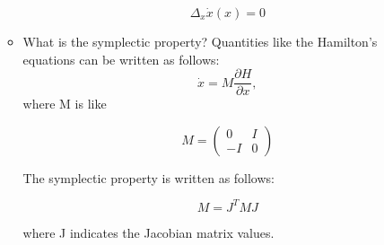 \begin{enumerate}
\begin{itemize}
        $$
        \Delta_x \dot{x}(x) = 0
        $$

        \item What is the symplectic property? Quantities like the Hamilton's equations can be written as follows:
        $$
        \dot{x} = M \frac{\partial H}{\partial x},
        $$
        where M is like 

        $$
        M = \begin{pmatrix} 0 & I\\ -I & 0\end{pmatrix}
        $$

        The symplectic property is written as follows:

        $$M = J^TMJ$$

        where J indicates the Jacobian matrix values.
        


\end{itemize}
\end{enumerate}
